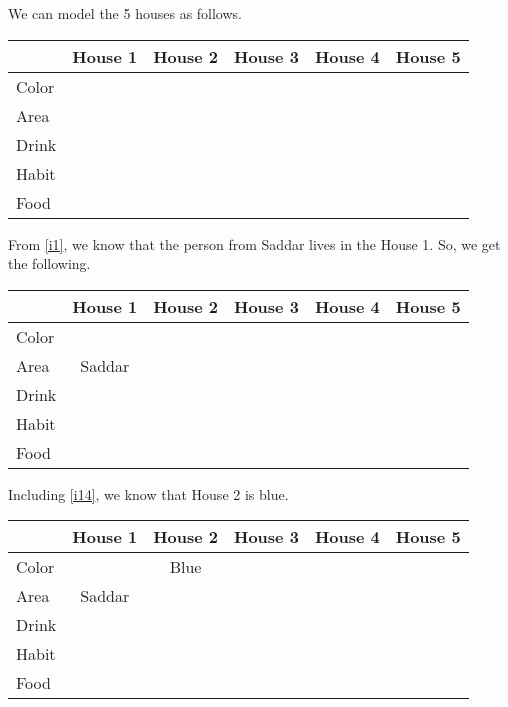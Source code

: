 \documentclass[a4paper]{exam}
\newcommand\cb{\color{blue}}
\begin{document}
\begin{questions}
  \begin{solution}
    We can model the 5 houses as follows.
    
    \begin{tabular}{l||*5{c|}}
      & \textbf{House 1} & \textbf{House 2} & \textbf{House 3} & \textbf{House 4} & \textbf{House 5} \\
      \hline\hline
      Color & & & & & \\\hline
      Area & & & & & \\\hline
      Drink & & & & & \\\hline
      Habit & & & & & \\\hline
      Food & & & & & \\\hline
    \end{tabular}

    From \ref{i1}, we know that the person from Saddar lives in the House 1. So, we get the following.\\
    \begin{tabular}{l||*5{c|}}
      & \textbf{House 1} & \textbf{House 2} & \textbf{House 3} & \textbf{House 4} & \textbf{House 5} \\
      \hline\hline
      Color & & & & & \\\hline
      Area & Saddar & & & & \\\hline
      Drink & & & & & \\\hline
      Habit & & & & & \\\hline
      Food & & & & & \\\hline
    \end{tabular}

    Including \ref{i14}, we know that House 2 is blue.\\
    \begin{tabular}{l||*5{c|}}
      & \textbf{House 1} & \textbf{\cb House 2} & \textbf{House 3} & \textbf{House 4} & \textbf{House 5} \\
      \hline\hline
      Color & & Blue & & & \\\hline
      Area & Saddar & & & & \\\hline
      Drink & & & & & \\\hline
      Habit & & & & & \\\hline
      Food & & & & & \\\hline
    \end{tabular}
  \end{solution}
  
\end{questions}
\end{document}

